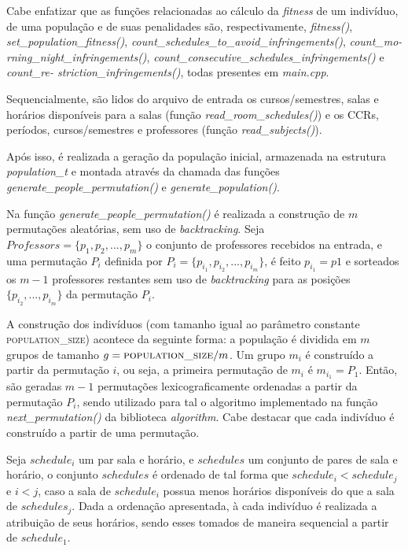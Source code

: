 \documentclass[12pt]{article}
\begin{document}
Cabe enfatizar que as funções relacionadas ao cálculo da \textit{fitness} de um indivíduo, de uma população e de suas penalidades são, respectivamente, \emph{fitness()}, \emph{set\_population\_fitness()}, \emph{count\_schedules\_to\_avoid\_infringements()}, \emph{count\_mo- rning\_night\_infringements()}, \emph{count\_consecutive\_schedules\_infringements()} e \emph{count\_re- striction\_infringements()}, todas presentes em \emph{main.cpp}.

Sequencialmente, são lidos do arquivo de entrada os cursos/semestres, salas e horários disponíveis para a salas (função \emph{read\_room\_schedules()}) e os CCRs, períodos, cursos/semestres e professores (função \emph{read\_subjects()}).

Após isso, é realizada a geração da população inicial, armazenada na estrutura \emph{population\_t} e montada através da chamada das funções \emph{generate\_people\_permutation()} e \emph{generate\_population()}.

Na função \emph{generate\_people\_permutation()} é realizada a construção de $m$ permutações aleatórias, sem uso de \textit{backtracking}. Seja $Professors = \{p_{1}, p_{2}, . . . , p_{m}\}$ o conjunto de professores recebidos na entrada, e uma permutação $P_{i}$ definida por $P_{i} = \{p_{i_{1}}, p_{i_{2}}, . . . , p_{i_{m}}\}$, é feito $p_{i_{1}} = p{1}$ e sorteados os $m-1$ professores restantes sem uso de \textit{backtracking} para as posições $\{p_{i_{2}}, . . . , p_{i_{m}}\}$ da permutação $P_{i}$.

A construção dos indivíduos (com tamanho igual ao parâmetro constante \textsc{population\_size}) acontece da seguinte forma: a população é dividida em $m$ grupos de tamanho $g = \textsc{population\_size} / m$. Um grupo $m_{i}$ é construído a partir da permutação $i$, ou seja, a primeira permutação de $m_{i}$ é $m_{i_{1}} = P_{1}$. Então, são geradas $m-1$ permutações lexicograficamente ordenadas a partir da permutação $P_{i}$, sendo utilizado para tal o algoritmo implementado na função \emph{next\_permutation()} da biblioteca \emph{algorithm}. Cabe destacar que cada indivíduo é construído a partir de uma permutação.

Seja $schedule_{i}$ um par sala e horário, e $schedules$ um conjunto de pares de sala e horário, o conjunto $schedules$ é ordenado de tal forma que $schedule_{i} < schedule_{j}$ e $i < j$, caso a sala de $schedule_{i}$ possua menos horários disponíveis do que a sala de $schedules_{j}$. Dada a ordenação apresentada, à cada indivíduo é realizada a atribuição de seus horários, sendo esses tomados de maneira sequencial a partir de $schedule_{1}$.
\end{document}
